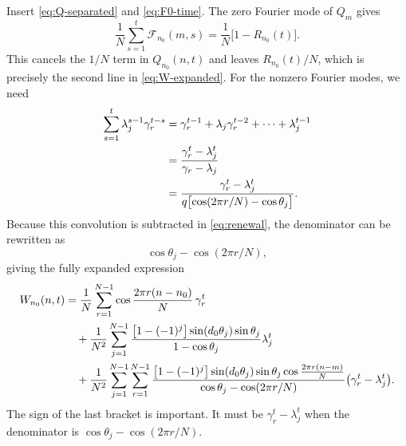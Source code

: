 \documentclass[11pt]{article}
\begin{document}
Insert \eqref{eq:Q-separated} and \eqref{eq:F0-time}.  The zero Fourier mode of $Q_m$ gives
\begin{equation}
  \frac1N\sum_{s=1}^{t}\mathcal F_{n_0}(m,s)
  =\frac1N\bigl[1-R_{n_0}(t)\bigr].
\end{equation}
This cancels the $1/N$ term in $Q_{n_0}(n,t)$ and leaves $R_{n_0}(t)/N$, which is precisely the
second line in \eqref{eq:W-expanded}.  For the nonzero Fourier modes, we need
\begin{align}
  \sum_{s=1}^{t}\lambda_j^{s-1}\gamma_r^{t-s}
  &=\gamma_r^{t-1}+\lambda_j\gamma_r^{t-2}+\cdots+\lambda_j^{t-1}\notag\\
  &=\frac{\gamma_r^t-\lambda_j^t}{\gamma_r-\lambda_j}\notag\\
  &=\frac{\gamma_r^t-\lambda_j^t}
  {q\bigl[\cos(2\pi r/N)-\cos\theta_j\bigr]}.
  \label{eq:time-convolution}
\end{align}
Because this convolution is subtracted in \eqref{eq:renewal}, the denominator can be rewritten as
\[
  \cos\theta_j-\cos(2\pi r/N),
\]
giving the fully expanded expression
\begin{align}
  W_{n_0}(n,t)
  &=\frac1N\sum_{r=1}^{N-1}
  \cos\frac{2\pi r(n-n_0)}{N}\,\gamma_r^t\notag\\
  &\quad+\frac{1}{N^2}\sum_{j=1}^{N-1}
  \frac{\bigl[1-(-1)^j\bigr]\sin(d_0\theta_j)\sin\theta_j}
  {1-\cos\theta_j}\lambda_j^t\notag\\
  &\quad+\frac{1}{N^2}\sum_{j=1}^{N-1}\sum_{r=1}^{N-1}
  \frac{\bigl[1-(-1)^j\bigr]\sin(d_0\theta_j)\sin\theta_j
  \cos\frac{2\pi r(n-m)}{N}}
  {\cos\theta_j-\cos(2\pi r/N)}
  \bigl(\gamma_r^t-\lambda_j^t\bigr).
  \label{eq:W-expanded}
\end{align}
The sign of the last bracket is important.  It must be $\gamma_r^t-\lambda_j^t$ when the
denominator is $\cos\theta_j-\cos(2\pi r/N)$.
\end{document}
